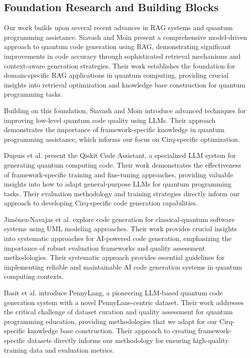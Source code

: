 \documentclass[runningheads]{llncs}
\begin{document}
\subsection{Foundation Research and Building Blocks}
Our work builds upon several recent advances in RAG systems and quantum programming assistance. Siavash and Moin \cite{siavash2025modeldrivenquantumcodegeneration} present a comprehensive model-driven approach to quantum code generation using RAG, demonstrating significant improvements in code accuracy through sophisticated retrieval mechanisms and context-aware generation strategies. Their work establishes the foundation for domain-specific RAG applications in quantum computing, providing crucial insights into retrieval optimization and knowledge base construction for quantum programming tasks.

Building on this foundation, Siavash and Moin \cite{siavash2025llmpoweredquantumcodetranspilation} introduce advanced techniques for improving low-level quantum code quality using LLMs. Their approach demonstrates the importance of framework-specific knowledge in quantum programming assistance, which informs our focus on Cirq-specific optimization.

Dupuis et al. \cite{10691762} present the Qiskit Code Assistant, a specialized LLM system for generating quantum computing code. Their work demonstrates the effectiveness of framework-specific training and fine-tuning approaches, providing valuable insights into how to adapt general-purpose LLMs for quantum programming tasks. Their evaluation methodology and training strategies directly inform our approach to developing Cirq-specific code generation capabilities.

Jiménez-Navajas et al. \cite{jimenez2025codegeneration} explore code generation for classical-quantum software systems using UML modeling approaches. Their work provides crucial insights into systematic approaches for AI-powered code generation, emphasizing the importance of robust evaluation frameworks and quality assessment methodologies. Their systematic approach provides essential guidelines for implementing reliable and maintainable AI code generation systems in quantum computing contexts.

Basit et al. \cite{basit2025pennylangpioneeringllmbasedquantum} introduce PennyLang, a pioneering LLM-based quantum code generation system with a novel PennyLane-centric dataset. Their work addresses the critical challenge of dataset curation and quality assessment for quantum programming education, providing methodologies that we adapt for our Cirq-specific knowledge base construction. Their approach to creating framework-specific datasets directly informs our methodology for ensuring high-quality training data and evaluation metrics.
\end{document}
